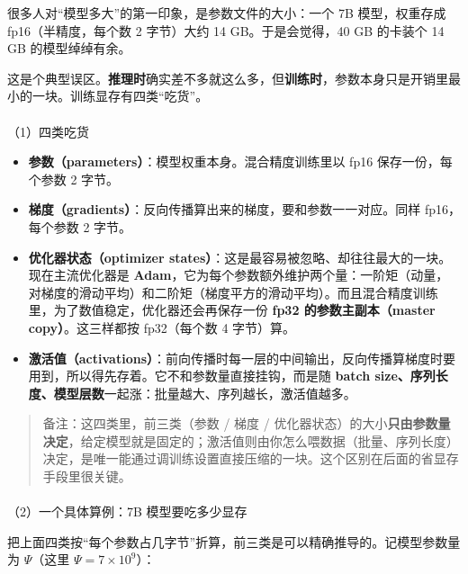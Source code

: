 \documentclass[
  chinese,
]{ctexart}
\makeatletter
\let\oldparagraph\paragraph
\renewcommand{\paragraph}{
    \@ifstar
      \xxxParagraphStar
      \xxxParagraphNoStar
  }
\newcommand{\xxxParagraphStar}[1]{\oldparagraph*{#1}\mbox{}}
\newcommand{\xxxParagraphNoStar}[1]{\oldparagraph{#1}\mbox{}}
\providecommand{\tightlist}{%
  \setlength{\itemsep}{0pt}\setlength{\parskip}{0pt}}
\makeatother
\begin{document}
很多人对``模型多大''的第一印象，是参数文件的大小：一个 7B 模型，权重存成
fp16（半精度，每个数 2 字节）大约 14 GB。于是会觉得，40 GB 的卡装个 14
GB 的模型绰绰有余。

这是个典型误区。\textbf{推理时}确实差不多就这么多，但\textbf{训练时}，参数本身只是开销里最小的一块。训练显存有四类``吃货''。

\paragraph{（1）四类吃货}\label{ux56dbux7c7bux5403ux8d27}

\begin{itemize}
\tightlist
\item
  \textbf{参数（parameters）}：模型权重本身。混合精度训练里以 fp16
  保存一份，每个参数 2 字节。
\item
  \textbf{梯度（gradients）}：反向传播算出来的梯度，要和参数一一对应。同样
  fp16，每个参数 2 字节。
\item
  \textbf{优化器状态（optimizer
  states）}：这是最容易被忽略、却往往最大的一块。现在主流优化器是
  \textbf{Adam}，它为每个参数额外维护两个量：一阶矩（动量，对梯度的滑动平均）和二阶矩（梯度平方的滑动平均）。而且混合精度训练里，为了数值稳定，优化器还会再保存一份
  \textbf{fp32 的参数主副本（master copy）}。这三样都按 fp32（每个数 4
  字节）算。
\item
  \textbf{激活值（activations）}：前向传播时每一层的中间输出，反向传播算梯度时要用到，所以得先存着。它不和参数量直接挂钩，而是随
  \textbf{batch
  size、序列长度、模型层数}一起涨：批量越大、序列越长，激活值越多。
\end{itemize}

\begin{quote}
备注：这四类里，前三类（参数 / 梯度 /
优化器状态）的大小\textbf{只由参数量决定}，给定模型就是固定的；激活值则由你怎么喂数据（批量、序列长度）决定，是唯一能通过调训练设置直接压缩的一块。这个区别在后面的省显存手段里很关键。
\end{quote}

\paragraph{（2）一个具体算例：7B
模型要吃多少显存}\label{ux4e00ux4e2aux5177ux4f53ux7b97ux4f8b7b-ux6a21ux578bux8981ux5403ux591aux5c11ux663eux5b58}

把上面四类按``每个参数占几字节''折算，前三类是可以精确推导的。记模型参数量为
\(\Psi\)（这里 \(\Psi = 7\times 10^9\)）：
\end{document}
